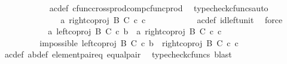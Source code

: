 \begin{isabellebody}
\ \ \ \ \ \ \ \ \ \ \isamarkupfalse%
\ a{\isacharprime}{\kern0pt}c{\isacharprime}{\kern0pt}{\isacharunderscore}{\kern0pt}def\ cfunc{\isacharunderscore}{\kern0pt}cross{\isacharunderscore}{\kern0pt}prod{\isacharunderscore}{\kern0pt}comp{\isacharunderscore}{\kern0pt}cfunc{\isacharunderscore}{\kern0pt}prod\ \isamarkupfalse%
\ {\isacharparenleft}{\kern0pt}typecheck{\isacharunderscore}{\kern0pt}cfuncs{\isacharcomma}{\kern0pt}auto{\isacharparenright}{\kern0pt}\isanewline
\ \ \ \ \ \ \ \ \isamarkupfalse%
\ \isamarkupfalse%
\ {\isachardoublequoteopen}{\isachardot}{\kern0pt}{\isachardot}{\kern0pt}{\isachardot}{\kern0pt}\ {\isacharequal}{\kern0pt}\ \ {\isasymlangle}a{\isacharprime}{\kern0pt}{\isacharcomma}{\kern0pt}\ right{\isacharunderscore}{\kern0pt}coproj\ B\ C\ {\isasymcirc}\isactrlsub c\ c{\isacharprime}{\kern0pt}{\isasymrangle}{\isachardoublequoteclose}\isanewline
\ \ \ \ \ \ \ \ \ \ \isamarkupfalse%
\ a{\isacharprime}{\kern0pt}c{\isacharprime}{\kern0pt}{\isacharunderscore}{\kern0pt}def\ id{\isacharunderscore}{\kern0pt}left{\isacharunderscore}{\kern0pt}unit{}\ \isamarkupfalse%
\ force\isanewline
\ \ \ \ \ \ \ \ \isamarkupfalse%
\ \isamarkupfalse%
\ {\isachardoublequoteopen}{\isasymlangle}a{\isacharcomma}{\kern0pt}\ left{\isacharunderscore}{\kern0pt}coproj\ B\ C\ {\isasymcirc}\isactrlsub c\ b{\isasymrangle}\ {\isacharequal}{\kern0pt}\ {\isasymlangle}a{\isacharprime}{\kern0pt}{\isacharcomma}{\kern0pt}\ right{\isacharunderscore}{\kern0pt}coproj\ B\ C\ {\isasymcirc}\isactrlsub c\ c{\isacharprime}{\kern0pt}{\isasymrangle}{\isachardoublequoteclose}\isacommand{{\isachardot}{\kern0pt}}\isamarkupfalse%
\isanewline
\ \ \ \ \ \ \isamarkupfalse%
\ \ \ \ \ \ \ \ \isanewline
\ \ \ \ \ \ \isamarkupfalse%
\ \isamarkupfalse%
\ impossible{\isacharcolon}{\kern0pt}\ {\isachardoublequoteopen}left{\isacharunderscore}{\kern0pt}coproj\ B\ C\ {\isasymcirc}\isactrlsub c\ b\ {\isacharequal}{\kern0pt}\ right{\isacharunderscore}{\kern0pt}coproj\ B\ C\ {\isasymcirc}\isactrlsub c\ c{\isacharprime}{\kern0pt}{\isachardoublequoteclose}\isanewline
\ \ \ \ \ \ \ \ \isamarkupfalse%
\ a{\isacharprime}{\kern0pt}c{\isacharprime}{\kern0pt}{\isacharunderscore}{\kern0pt}def\ ab{\isacharunderscore}{\kern0pt}def\ element{\isacharunderscore}{\kern0pt}pair{\isacharunderscore}{\kern0pt}eq\ equal{\isacharunderscore}{\kern0pt}pair\ \isamarkupfalse%
\ {\isacharparenleft}{\kern0pt}typecheck{\isacharunderscore}{\kern0pt}cfuncs{\isacharcomma}{\kern0pt}\ blast{\isacharparenright}{\kern0pt}\isanewline

\end{isabellebody}

